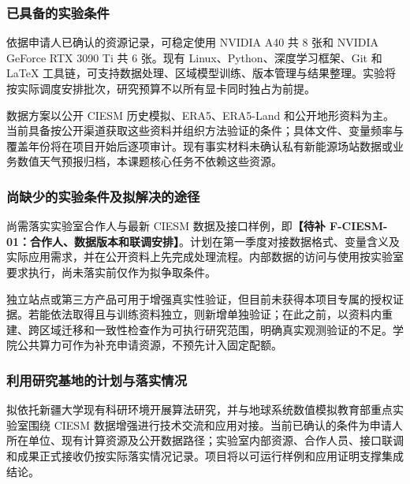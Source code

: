 \justifying
\NSFCBodyText

\subsubsection{已具备的实验条件}

依据申请人已确认的资源记录，可稳定使用 NVIDIA A40 共 8 张和 NVIDIA GeForce RTX 3090 Ti 共 6 张。现有 Linux、Python、深度学习框架、Git 和 LaTeX 工具链，可支持数据处理、区域模型训练、版本管理与结果整理。实验将按实际调度安排批次，研究预算不以所有显卡同时独占为前提。

数据方案以公开 CIESM 历史模拟、ERA5、ERA5-Land 和公开地形资料为主。当前具备按公开渠道获取这些资料并组织方法验证的条件；具体文件、变量频率与覆盖年份将在项目开始后逐项审计。现有事实材料未确认私有新能源场站数据或业务数值天气预报归档，本课题核心任务不依赖这些资源。

\subsubsection{尚缺少的实验条件及拟解决的途径}

尚需落实实验室合作人与最新 CIESM 数据及接口样例，即\textbf{【待补 F-CIESM-01：合作人、数据版本和联调安排】}。计划在第一季度对接数据格式、变量含义及实际应用需求，并在公开资料上先完成处理流程。内部数据的访问与使用按实验室要求执行，尚未落实前仅作为拟争取条件。

独立站点或第三方产品可用于增强真实性验证，但目前未获得本项目专属的授权证据。若能依法取得且与训练资料独立，则新增单独验证；在此之前，以资料内重建、跨区域迁移和一致性检查作为可执行研究范围，明确真实观测验证的不足。学院公共算力可作为补充申请资源，不预先计入固定配额。

\subsubsection{利用研究基地的计划与落实情况}

拟依托新疆大学现有科研环境开展算法研究，并与地球系统数值模拟教育部重点实验室围绕 CIESM 数据增强进行技术交流和应用对接。当前已确认的条件为申请人所在单位、现有计算资源及公开数据路径；实验室内部资源、合作人员、接口联调和成果正式接收仍按实际落实情况记录。项目将以可运行样例和应用证明支撑集成结论。
